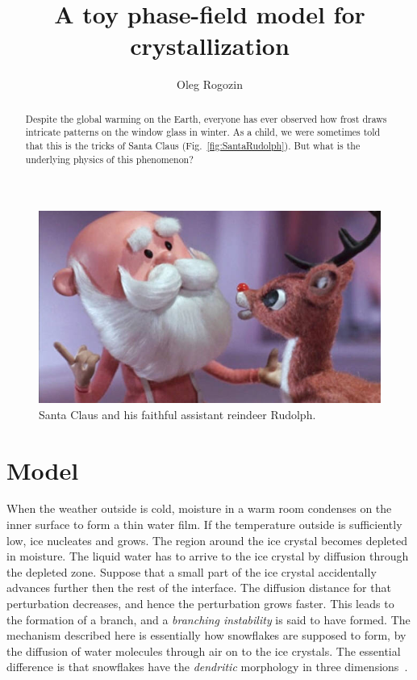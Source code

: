 \documentclass{article}
\title{A toy phase-field model for crystallization}
\author{Oleg Rogozin}
\begin{document}
\maketitle

\begin{figure}
    \centering
    \includegraphics{SantaRudolph}
    \caption{Santa Claus and his faithful assistant reindeer Rudolph.}
    \label{fig:SantaRudolph}
\end{figure}

\begin{abstract}
Despite the global warming on the Earth, everyone has ever observed
how frost draws intricate patterns on the window glass in winter.
As a child, we were sometimes told that this is the tricks of Santa Claus (Fig.~\ref{fig:SantaRudolph}).
But what is the underlying physics of this phenomenon?
\end{abstract}

\tableofcontents

\section{Model}

When the weather outside is cold, moisture in a warm room condenses on the inner surface to form a thin water film.
If the temperature outside is sufficiently low, ice nucleates and grows.
The region around the ice crystal becomes depleted in moisture.
The liquid water has to arrive to the ice crystal by diffusion through the depleted zone.
Suppose that a small part of the ice crystal accidentally advances further then the rest of the interface.
The diffusion distance for that perturbation decreases, and hence the perturbation grows faster.
This leads to the formation of a branch, and a \emph{branching instability} is said to have formed.
The mechanism described here is essentially how snowflakes are supposed to form,
by the diffusion of water molecules through air on to the ice crystals.
The essential difference is that snowflakes have the \emph{dendritic} morphology in three dimensions~\cite{dendrites}.
\end{document}
